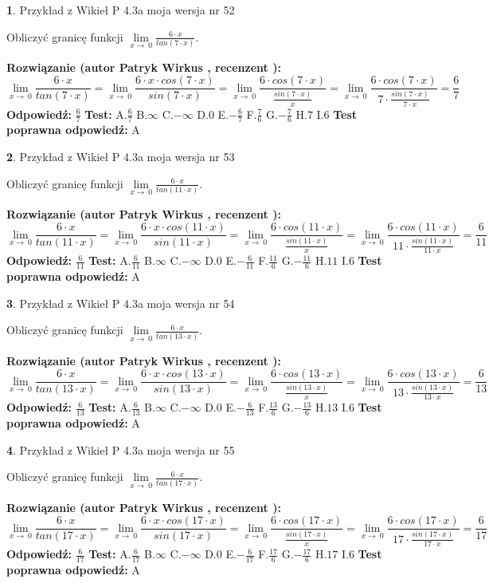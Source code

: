 \documentclass[12pt, a4paper]{article}
\theoremstyle{definition} %
\newtheorem{zad}{}
\newcommand{\zadStart}[1]{\begin{zad}#1\newline}
\newcommand{\zadStop}{\end{zad}}
\newcommand{\rozwStart}[2]{\noindent \textbf{Rozwiązanie (autor #1 , recenzent #2): }\newline}
\newcommand{\rozwStop}{\newline}
\newcommand{\odpStart}{\noindent \textbf{Odpowiedź:}\newline}
\newcommand{\odpStop}{\newline}
\newcommand{\testStart}{\noindent \textbf{Test:}\newline}
\newcommand{\testStop}{\newline}
\newcommand{\kluczStart}{\noindent \textbf{Test poprawna odpowiedź:}\newline}
\newcommand{\kluczStop}{\newline}
\begin{document}
\zadStart{Przykład z Wikieł P 4.3a moja wersja nr 52}


Obliczyć granicę funkcji $\lim\limits_{x\to\ 0}\frac{6 \cdot x}{tan(7 \cdot x)}$.
\zadStop
\rozwStart{Patryk Wirkus}{}
$$\lim\limits_{x\to\ 0}\frac{6 \cdot x}{tan(7 \cdot x)}=\lim\limits_{x\to\ 0}\frac{6 \cdot x \cdot cos(7 \cdot x)}{sin(7 \cdot x)}=\lim\limits_{x\to\ 0}\frac{6 \cdot cos(7 \cdot x)}{\frac{sin(7 \cdot x)}{x}}=\lim\limits_{x\to\ 0}\frac{6 \cdot cos(7 \cdot x)}{7 \cdot \frac{sin(7 \cdot x)}{7 \cdot x}} = \frac{6}{7}$$
\rozwStop
\odpStart
$\frac{6}{7}$
\odpStop
\testStart
A.$\frac{6}{7}$
B.$\infty$
C.$-\infty$
D.$0$
E.$-\frac{6}{7}$
F.$\frac{7}{6}$
G.$-\frac{7}{6}$
H.$7$
I.$6$
\testStop
\kluczStart
A
\kluczStop



\zadStart{Przykład z Wikieł P 4.3a moja wersja nr 53}


Obliczyć granicę funkcji $\lim\limits_{x\to\ 0}\frac{6 \cdot x}{tan(11 \cdot x)}$.
\zadStop
\rozwStart{Patryk Wirkus}{}
$$\lim\limits_{x\to\ 0}\frac{6 \cdot x}{tan(11 \cdot x)}=\lim\limits_{x\to\ 0}\frac{6 \cdot x \cdot cos(11 \cdot x)}{sin(11 \cdot x)}=\lim\limits_{x\to\ 0}\frac{6 \cdot cos(11 \cdot x)}{\frac{sin(11 \cdot x)}{x}}=\lim\limits_{x\to\ 0}\frac{6 \cdot cos(11 \cdot x)}{11 \cdot \frac{sin(11 \cdot x)}{11 \cdot x}} = \frac{6}{11}$$
\rozwStop
\odpStart
$\frac{6}{11}$
\odpStop
\testStart
A.$\frac{6}{11}$
B.$\infty$
C.$-\infty$
D.$0$
E.$-\frac{6}{11}$
F.$\frac{11}{6}$
G.$-\frac{11}{6}$
H.$11$
I.$6$
\testStop
\kluczStart
A
\kluczStop



\zadStart{Przykład z Wikieł P 4.3a moja wersja nr 54}


Obliczyć granicę funkcji $\lim\limits_{x\to\ 0}\frac{6 \cdot x}{tan(13 \cdot x)}$.
\zadStop
\rozwStart{Patryk Wirkus}{}
$$\lim\limits_{x\to\ 0}\frac{6 \cdot x}{tan(13 \cdot x)}=\lim\limits_{x\to\ 0}\frac{6 \cdot x \cdot cos(13 \cdot x)}{sin(13 \cdot x)}=\lim\limits_{x\to\ 0}\frac{6 \cdot cos(13 \cdot x)}{\frac{sin(13 \cdot x)}{x}}=\lim\limits_{x\to\ 0}\frac{6 \cdot cos(13 \cdot x)}{13 \cdot \frac{sin(13 \cdot x)}{13 \cdot x}} = \frac{6}{13}$$
\rozwStop
\odpStart
$\frac{6}{13}$
\odpStop
\testStart
A.$\frac{6}{13}$
B.$\infty$
C.$-\infty$
D.$0$
E.$-\frac{6}{13}$
F.$\frac{13}{6}$
G.$-\frac{13}{6}$
H.$13$
I.$6$
\testStop
\kluczStart
A
\kluczStop



\zadStart{Przykład z Wikieł P 4.3a moja wersja nr 55}


Obliczyć granicę funkcji $\lim\limits_{x\to\ 0}\frac{6 \cdot x}{tan(17 \cdot x)}$.
\zadStop
\rozwStart{Patryk Wirkus}{}
$$\lim\limits_{x\to\ 0}\frac{6 \cdot x}{tan(17 \cdot x)}=\lim\limits_{x\to\ 0}\frac{6 \cdot x \cdot cos(17 \cdot x)}{sin(17 \cdot x)}=\lim\limits_{x\to\ 0}\frac{6 \cdot cos(17 \cdot x)}{\frac{sin(17 \cdot x)}{x}}=\lim\limits_{x\to\ 0}\frac{6 \cdot cos(17 \cdot x)}{17 \cdot \frac{sin(17 \cdot x)}{17 \cdot x}} = \frac{6}{17}$$
\rozwStop
\odpStart
$\frac{6}{17}$
\odpStop
\testStart
A.$\frac{6}{17}$
B.$\infty$
C.$-\infty$
D.$0$
E.$-\frac{6}{17}$
F.$\frac{17}{6}$
G.$-\frac{17}{6}$
H.$17$
I.$6$
\testStop
\kluczStart
A
\kluczStop
\end{document}
